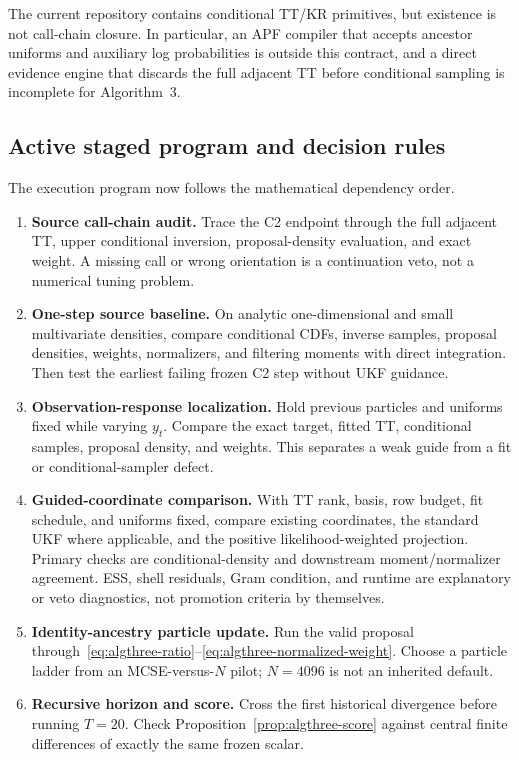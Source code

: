 \documentclass[11pt]{article}
\begin{document}
The current repository contains conditional TT/KR primitives, but existence is
not call-chain closure.  In particular, an APF compiler that accepts ancestor
uniforms and auxiliary log probabilities is outside this contract, and a
direct evidence engine that discards the full adjacent TT before conditional
sampling is incomplete for Algorithm~3.

\subsection{Active staged program and decision rules}

The execution program now follows the mathematical dependency order.
\begin{enumerate}
\item \textbf{Source call-chain audit.}  Trace the C2 endpoint through the full
  adjacent TT, upper conditional inversion, proposal-density evaluation, and
  exact weight.  A missing call or wrong orientation is a continuation veto,
  not a numerical tuning problem.
\item \textbf{One-step source baseline.}  On analytic one-dimensional and
  small multivariate densities, compare conditional CDFs, inverse samples,
  proposal densities, weights, normalizers, and filtering moments with direct
  integration.  Then test the earliest failing frozen C2 step without UKF
  guidance.
\item \textbf{Observation-response localization.}  Hold previous particles
  and uniforms fixed while varying $y_t$.  Compare the exact target, fitted TT,
  conditional samples, proposal density, and weights.  This separates a weak
  guide from a fit or conditional-sampler defect.
\item \textbf{Guided-coordinate comparison.}  With TT rank, basis, row budget,
  fit schedule, and uniforms fixed, compare existing coordinates, the standard
  UKF where applicable, and the positive likelihood-weighted projection.
  Primary checks are conditional-density and downstream moment/normalizer
  agreement.  ESS, shell residuals, Gram condition, and runtime are explanatory
  or veto diagnostics, not promotion criteria by themselves.
\item \textbf{Identity-ancestry particle update.}  Run the valid proposal
  through~\eqref{eq:algthree-ratio}--\eqref{eq:algthree-normalized-weight}.
  Choose a particle ladder from an MCSE-versus-$N$ pilot; $N=4096$ is not an
  inherited default.
\item \textbf{Recursive horizon and score.}  Cross the first historical
  divergence before running $T=20$.  Check
  Proposition~\ref{prop:algthree-score} against central finite differences of
  exactly the same frozen scalar.
\end{enumerate}
\end{document}
